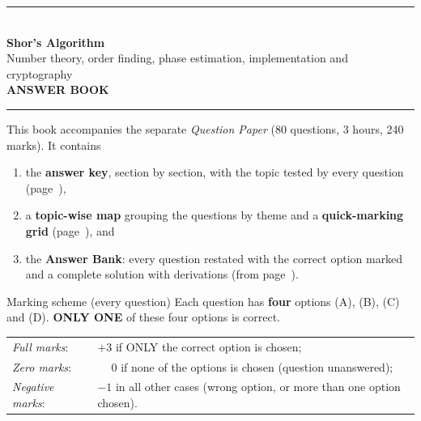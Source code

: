 \documentclass[11pt,a4paper]{article}
\begin{document}
\pagestyle{fancy}\fancyhf{}
\renewcommand{\headrulewidth}{0.4pt}

\thispagestyle{empty}
\begin{center}
{\color{brand}\rule{\linewidth}{1.2pt}}\\[6pt]
{\Huge\bfseries\color{brand} Shor's Algorithm}\\[4pt]
{\Large Number theory, order finding, phase estimation, implementation and cryptography}\\[4pt]
{\large\bfseries ANSWER BOOK}\\[2pt]
{\color{brand}\rule{\linewidth}{1.2pt}}
\end{center}
This book accompanies the separate \emph{Question Paper} (80 questions, 3 hours, 240 marks). It contains
\begin{enumerate}[leftmargin=1.4em, itemsep=0pt, topsep=2pt]
\item the \textbf{answer key}, section by section, with the topic tested by every question (page~\pageref{key}),
\item a \textbf{topic-wise map} grouping the questions by theme and a \textbf{quick-marking grid} (page~\pageref{topicmap}), and
\item the \textbf{Answer Bank}: every question restated with the correct option marked \textcolor{okgreen}{} and a
      complete solution with derivations (from page~\pageref{bank}).
\end{enumerate}
\begin{infobox}{Marking scheme (every question)}
Each question has \textbf{four} options (A), (B), (C) and (D). \textbf{ONLY ONE} of these four options is correct.\\[2pt]
\begin{tabular}{@{}ll@{}}
\emph{Full marks}: & $+3$ if ONLY the correct option is chosen;\\
\emph{Zero marks}: & $\phantom{+}0$ if none of the options is chosen (question unanswered);\\
\emph{Negative marks}: & $-1$ in all other cases (wrong option, or more than one option chosen).
\end{tabular}
\end{infobox}
\end{document}
